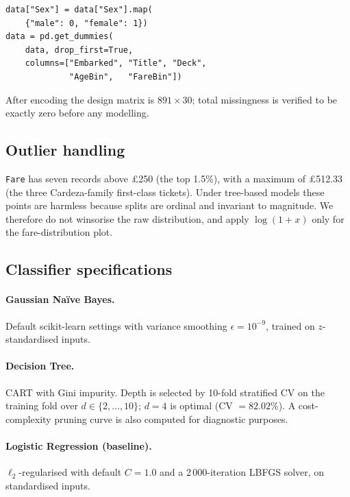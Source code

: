 \documentclass[10pt,a4paper,twocolumn]{article}
\begin{document}
\begin{minipage}{\linewidth}
\begin{lstlisting}[caption={Encoding.},label={lst:encode}]
data["Sex"] = data["Sex"].map(
    {"male": 0, "female": 1})
data = pd.get_dummies(
    data, drop_first=True,
    columns=["Embarked", "Title", "Deck",
             "AgeBin",   "FareBin"])
\end{lstlisting}
\end{minipage}

After encoding the design matrix is $891 \times 30$; total missingness is verified
to be exactly zero before any modelling.

\subsection{Outlier handling}
\texttt{Fare} has seven records above £250 (the top 1.5\%), with a maximum of £512.33
(the three Cardeza-family first-class tickets). Under tree-based models these points
are harmless because splits are ordinal and invariant to magnitude. We therefore do
not winsorise the raw distribution, and apply $\log(1+x)$ only for the
fare-distribution plot.

\subsection{Classifier specifications}
\paragraph{Gaussian Na\"ive Bayes.} Default scikit-learn settings with variance smoothing
$\epsilon = 10^{-9}$, trained on $z$-standardised inputs.

\paragraph{Decision Tree.} CART with Gini impurity. Depth is selected by 10-fold
stratified CV on the training fold over $d\in\{2,\dots,10\}$; $d=4$ is optimal
(CV $= 82.02\%$). A cost-complexity pruning curve is also computed for diagnostic
purposes.

\paragraph{Logistic Regression (baseline).} $\ell_2$-regularised with default
$C = 1.0$ and a 2\,000-iteration LBFGS solver, on standardised inputs.
\end{document}
